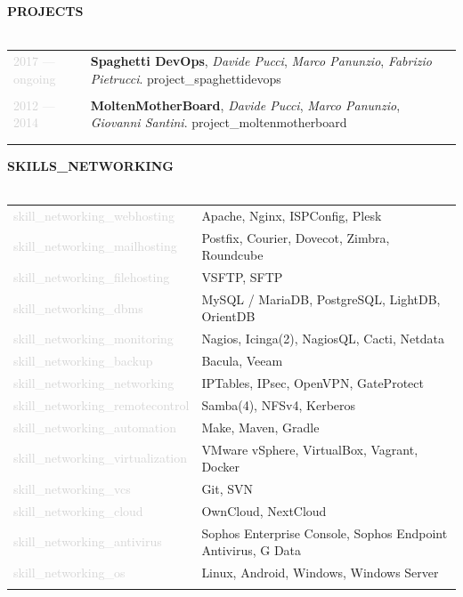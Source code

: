 \documentclass{article}
\begin{document}
\textbf{\textcolor{deepblue}{\uppercase{{{projects}}}}} \\\\ \hfill
\begin{tabular}{ R{3cm} L{12cm} }
	\textcolor{lightgray}{2017 — {{ongoing}}} & \textbf{Spaghetti DevOps}, \textit{Davide Pucci}, \textit{Marco Panunzio}, \textit{Fabrizio Pietrucci}. \linebreak
		{{project_spaghettidevops}}  \\\\ \hfill
	\textcolor{lightgray}{2012 — 2014} &
		\textbf{MoltenMotherBoard}, \textit{Davide Pucci}, \textit{Marco Panunzio}, \textit{Giovanni Santini}. \linebreak
		{{project_moltenmotherboard}} \\\\ \hfill
\end{tabular}

\textbf{\textcolor{deepblue}{\uppercase{{{skills_networking}}}}} \\\\ \hfill
\begin{tabular}{ R{4cm} L{11cm} }
	\textcolor{lightgray}{{{skill_networking_webhosting}}} & Apache, Nginx, ISPConfig, Plesk \\ \hfill
	\textcolor{lightgray}{{{skill_networking_mailhosting}}} & Postfix, Courier, Dovecot, Zimbra, Roundcube \\ \hfill
	\textcolor{lightgray}{{{skill_networking_filehosting}}} & VSFTP, SFTP \\ \hfill
	\textcolor{lightgray}{{{skill_networking_dbms}}} & MySQL / MariaDB, PostgreSQL, LightDB, OrientDB \\ \hfill
	\textcolor{lightgray}{{{skill_networking_monitoring}}} & Nagios, Icinga(2), NagiosQL, Cacti, Netdata \\ \hfill
	\textcolor{lightgray}{{{skill_networking_backup}}} & Bacula, Veeam \\ \hfill
	\textcolor{lightgray}{{{skill_networking_networking}}} & IPTables, IPsec, OpenVPN, GateProtect \\ \hfill
	\textcolor{lightgray}{{{skill_networking_remotecontrol}}} & Samba(4), NFSv4, Kerberos \\ \hfill
	\textcolor{lightgray}{{{skill_networking_automation}}} & Make, Maven, Gradle \\ \hfill
	\textcolor{lightgray}{{{skill_networking_virtualization}}} & VMware vSphere, VirtualBox, Vagrant, Docker \\ \hfill
	\textcolor{lightgray}{{{skill_networking_vcs}}} & Git, SVN \\ \hfill
	\textcolor{lightgray}{{{skill_networking_cloud}}} & OwnCloud, NextCloud \\ \hfill
	\textcolor{lightgray}{{{skill_networking_antivirus}}} & Sophos Enterprise Console, Sophos Endpoint Antivirus, G Data \\ \hfill
	\textcolor{lightgray}{{{skill_networking_os}}} & Linux, Android, Windows, Windows Server \\ \hfill
\end{tabular}
\end{document}
